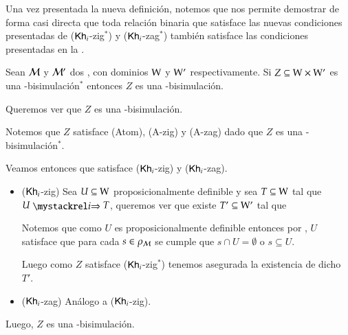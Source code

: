 Una vez presentada la nueva definición, notemos que  nos permite demostrar de forma casi directa que
toda relación binaria que satisface las nuevas condiciones presentadas de ($\mathsf{Kh}_i$-zig$^*$) y ($\mathsf{Kh}_i$-zag$^*$) también satisface las condiciones
presentadas en la .

\begin{lema}\label{lema:new-implies-old}
    Sean $\mathcal{M}$ y $\mathcal{M}'$ dos \ultss, con dominios $\mathrm{W}$ y $\mathrm{W}'$ respectivamente. Si $Z \subseteq \mathrm{W} \times \mathrm{W}'$ es una \KHilogic-bisimulación$^*$ entonces $Z$ es una \KHilogic-bisimulación.
\end{lema}

\begin{demostracion}
    Queremos ver que $Z$ es una \KHilogic-bisimulación.

    Notemos que $Z$ satisface (Atom), (A-zig) y (A-zag) dado que $Z$ es una \KHilogic-bisimulación$^*$.

    Veamos entonces que satisface ($\mathsf{Kh}_i$-zig) y ($\mathsf{Kh}_i$-zag).

    \begin{itemize}
        \item ($\mathsf{Kh}_i$-zig) Sea $U \subseteq \mathrm{W}$ proposicionalmente definible y sea $T \subseteq \mathrm{W}$ tal que $U \ultsExecAgi T$, queremos ver que existe
        $T' \subseteq \mathrm{W}'$ tal que

        \begin{multicols}{2}
        \end{multicols}
        Notemos que como $U$ es proposicionalmente definible entonces por , $U$ satisface que para cada $s \in \rho_{\mathcal{M}}$ se cumple
        que $s \cap U = \emptyset$ o $s \subseteq U$.
    
        Luego como $Z$ satisface ($\mathsf{Kh}_i$-zig$^*$) tenemos asegurada la existencia de dicho $T'$.
    
        \item ($\mathsf{Kh}_i$-zag) Análogo a ($\mathsf{Kh}_i$-zig).
    \end{itemize}

    Luego, $Z$ es una \KHilogic-bisimulación.
\end{demostracion}


